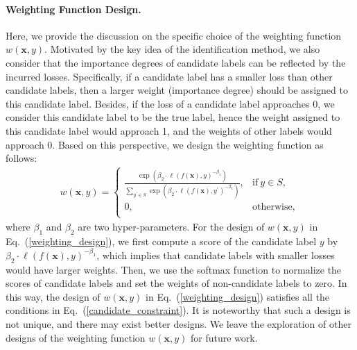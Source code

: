 \documentclass[letterpaper]{article} %
\begin{document}
\paragraph{Weighting Function Design.} Here, we provide the discussion on the specific choice of the weighting function $w(\bm{x},y)$. Motivated by the key idea of the identification method, we also consider that the importance degrees of candidate labels can be reflected by the incurred losses. Specifically, if a candidate label has a smaller loss than other candidate labels, then a larger weight (importance degree) should be assigned to this candidate label. Besides, if the loss of a candidate label approaches 0, we consider this candidate label to be the true label, hence the weight assigned to this candidate label would approach 1, and the weights of other labels would approach 0. Based on this perspective, we design the weighting function as follows:
\begin{gather}
\label{weighting_design}
w(\bm{x},y) = \left\{\begin{matrix}
 \frac{\exp(\beta_2\cdot\ell(f(\bm{x}),y)^{-\beta_1})}{\sum_{y^\prime\in S}\exp(\beta_2\cdot\ell(f(\bm{x}),y^\prime)^{-\beta_1})}, &\mathrm{if}\ y\in S, \\
0, &\mathrm{otherwise}, \\
\end{matrix}\right.
\end{gather}
where $\beta_1$ and $\beta_2$ are two hyper-parameters. For the design of $w(\bm{x},y)$ in Eq.~(\ref{weighting_design}), we first compute a score of the candidate label $y$ by $\beta_2\cdot\ell(f(\bm{x}),y)^{-\beta_1}$, which implies that candidate labels with smaller losses would have larger weights. Then, we use the softmax function to normalize the scores of candidate labels and set the weights of non-candidate labels to zero. In this way, the design of $w(\bm{x},y)$ in Eq.~(\ref{weighting_design}) satisfies all the conditions in Eq.~(\ref{candidate_constraint}). It is noteworthy that such a design is not unique, and there may exist better designs. We leave the exploration of other designs of the weighting function $w(\bm{x},y)$ for future work.
\end{document}
